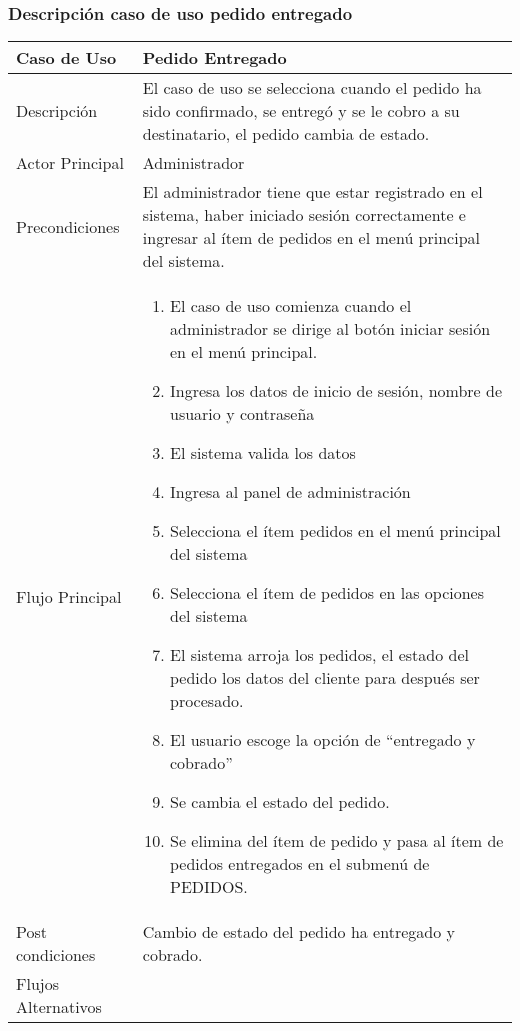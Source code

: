 \documentclass[12pt,a4paper]{article}
\begin{document}
    \newpage
\subsubsection*{Descripción caso de uso pedido entregado}
\begin{table}[h]
        \centering
        \begin{tabular}{| p{3cm}| p{11cm} |} 
        \hline  
        Caso de Uso         &    \textbf{ Pedido Entregado}   \\ 
        \hline
        Descripción         &    El caso de uso se selecciona cuando el pedido ha sido confirmado, se entregó y se le cobro a su destinatario, el pedido cambia de estado.   \\ 
        \hline
        Actor Principal     &  Administrador    \\ 
        \hline
        Precondiciones      &  El administrador tiene que estar registrado en el sistema, haber iniciado sesión correctamente e ingresar al ítem de pedidos en el menú principal del sistema.   	\\
        \hline
        Flujo Principal     &    

            \begin{enumerate}
                \item El caso de uso comienza cuando el administrador se dirige al botón iniciar sesión en el menú principal.
                \item Ingresa los datos de inicio de sesión, nombre de usuario y contraseña
                \item El sistema valida los datos
                \item Ingresa al panel de administración
                \item Selecciona el ítem pedidos en el menú principal del sistema
                \item Selecciona el ítem de pedidos en las opciones del sistema
                \item El sistema arroja los pedidos, el estado del pedido los datos del cliente para después ser procesado.
                \item El usuario escoge la opción de “entregado y cobrado”
                \item Se cambia el estado del pedido.
                \item Se elimina del ítem de pedido y pasa al ítem de pedidos entregados en el submenú de PEDIDOS.
            \end{enumerate}
        \\  
        \hline
        Post condiciones    &    Cambio de estado del pedido ha entregado y cobrado.   \\  
        \hline
        Flujos Alternativos &       \\  
        \hline
        \end{tabular}
    \end{table}
\end{document}

